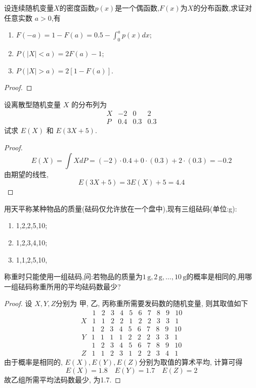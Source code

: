\documentclass[../main.tex]{subfiles}
\begin{document}
\begin{exercise}{}{}
设连续随机变量$X$的密度函数$p(x)$是一个偶函数,$F(x)$为$X$的分布函数,求证对任意实数 $a>0$,有
\begin{enumerate}
\item[(1)] $F(-a) = 1 - F(a) = 0.5 - \int_0^a p(x) dx$;
\item[(2)] $P(|X|<a) = 2F(a)-1$;
\item[(3)] $P(|X|>a) = 2[1-F(a)]$.
\end{enumerate}
\end{exercise}
\begin{proof}
    
\end{proof}
\begin{exercise}{}{}
    设离散型随机变量 $X$ 的分布列为
    \[
    \begin{array}{c|ccc}
    X & -2 & 0 & 2 \\
    \hline
    P & 0.4 & 0.3 & 0.3
    \end{array}
    \]
    试求 $E(X)$ 和 $E(3X+5)$.
\end{exercise}
\begin{proof}
     \[
     E\left( X \right)= \int X dP= \left( -2 \right)\cdot 0.4+ 0\cdot \left( 0.3 \right)+ 2\cdot \left( 0.3 \right)= -0.2   
     \]由期望的线性,  \[
     E\left( 3X+ 5 \right)= 3 E\left( X \right)+ 5= 4.4  
     \]
\end{proof}
\begin{exercise}{}{}
用天平称某种物品的质量(砝码仅允许放在一个盘中),现有三组砝码(单位:g):
\begin{enumerate}
\item[(甲)] 1,2,2,5,10;
\item[(乙)] 1,2,3,4,10;
\item[(丙)] 1,1,2,5,10,
\end{enumerate}
称重时只能使用一组砝码,问:若物品的质量为$1\,\mathrm{g}, 2\,\mathrm{g}, \dots, 10\,\mathrm{g}$的概率是相同的,用哪一组砝码称重所用的平均砝码数最少?
\end{exercise}
\begin{proof}
    设 \(  X,Y,Z  \)分别为 甲, 乙, 丙称重所需要发码数的随机变量, 则其取值如下    \[
    \begin{array}{c|ccccccccccc}
     & 1 & 2 & 3& 4& 5& 6& 7& 8& 9 & 10 \\
    \hline
    X & 1& 1& 2& 2& 1& 2& 2& 3& 3& 1
    \end{array}
    \]\[
    \begin{array}{c|ccccccccccc}
    & 1 & 2 & 3& 4& 5& 6& 7& 8& 9 & 10 \\
    \hline
    Y & 1& 1& 1& 1& 2& 2& 2& 3& 3& 1
    \end{array}
    \]\[
    \begin{array}{c|ccccccccccc}
     & 1 & 2 & 3& 4& 5& 6& 7& 8& 9 & 10 \\
    \hline
    Z & 1& 1& 2& 3& 1& 2& 2& 3& 4& 1
    \end{array}
    \]由于概率是相同的,  \(  E\left( X \right), E\left( Y \right), E\left( Z \right)     \)分别为取值的算术平均, 计算可得 \[
    E\left( X \right)=  1.8\quad E\left( Y \right)= 1.7\quad E\left( Z \right)= 2  
    \] 故乙组所需平均法码数最少, 为1.7.
\end{proof}
\end{document}
